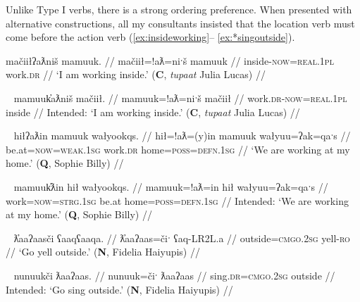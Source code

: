 Unlike Type I verbs, there is a strong ordering preference. When presented with alternative constructions, all my consultants insisted that the location verb must come before the action verb (\ref{ex:insideworking}-- \ref{ex:*singoutside}). 

\ex \label{ex:insideworking}
\begingl
\glpreamble mačiiłʔaƛniš mamuuk. //
\gla mačiił=!aƛ=niˑš mamuuk  //
\glb inside-\textsc{now}=\textsc{real.1pl} work.\textsc{dr} //
\glft `I am working inside.' (\textbf{C}, \textit{tupaat} Julia Lucas) //
\endgl
\xe

\ex~ \label{ex:*insideworking}
\begingl
\glpreamble *mamuuk̓aƛniš mačiił. //
\gla mamuuk=!aƛ=niˑš mačiił //
\glb work.\textsc{dr}-\textsc{now}=\textsc{real.1pl} inside //
\glft Intended: `I am working inside.' (\textbf{C}, \textit{tupaat} Julia Lucas) //
\endgl
\xe

\ex~ \label{ex:workathome}
\begingl
\glpreamble hiłʔaƛin mamuuk wałyookqs. //
\gla hił=!aƛ=(y)in mamuuk wałyuu=ʔak=qaˑs  //
\glb be.at=\textsc{now}=\textsc{weak.1sg} work.\textsc{dr} home=\textsc{poss}=\textsc{defn.1sg} //
\glft `We are working at my home.' (\textbf{Q}, Sophie Billy) //
\endgl
\xe

\ex~ \label{ex:*workathome}
\begingl
\glpreamble *mamuuk̓ƛin hił wałyookqs. //
\gla mamuuk=!aƛ=in hił wałyuu=ʔak=qaˑs  //
\glb work=\textsc{now}=\textsc{strg.1sg} be.at home=\textsc{poss}=\textsc{defn.1sg} //
\glft Intended: `We are working at my home.' (\textbf{Q}, Sophie Billy) //
\endgl
\xe

\ex~ \label{ex:shoutoutside}
\begingl
\glpreamble ƛ̓aaʔaasči ʕaaqʕaaqa. //
\gla ƛ̓aaʔaas=čiˑ ʕaq-LR2L.a  //
\glb outside=\textsc{cmgo.2sg} yell-\textsc{ro} //
\glft `Go yell outside.' (\textbf{N}, Fidelia Haiyupis) //
\endgl
\xe

\ex~ \label{ex:*singoutside}
\begingl
\glpreamble *nunuukči ƛaaʔaas. //
\gla nunuuk=čiˑ ƛaaʔaas  //
\glb sing.\textsc{dr}=\textsc{cmgo.2sg} outside //
\glft Intended: `Go sing outside.'\footnotemark{} (\textbf{N}, Fidelia Haiyupis) //
\endgl
\xe




